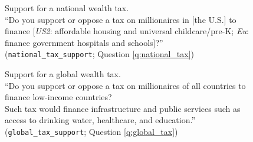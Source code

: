 
\begin{figure}[h!]
    \cprotect\caption[Support for a national wealth tax]{Support for a national wealth tax. \\ ``Do you support or oppose a tax on millionaires in [the U.S.] to finance [\textit{US2}: affordable housing and universal childcare/pre-K; \textit{Eu}: finance government hospitals and schools]?'' %
    (\verb|national_tax_support|; Question \ref{q:national_tax})}\label{fig:national_tax}
\end{figure}

\begin{figure}[h!]
    \cprotect\caption[Support for a global wealth tax]{Support for a global wealth tax. \\
    ``Do you support or oppose a tax on millionaires of all countries to finance low-income countries? \\
    Such tax would finance infrastructure and public services such as access to drinking water, healthcare, and education.'' (\verb|global_tax_support|; Question \ref{q:global_tax})}\label{fig:global_tax}
\end{figure}

